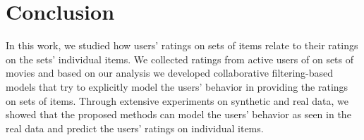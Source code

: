 \section{Conclusion} \label{ch:lfs:conclusion}
In this work, we studied how users' ratings on sets of items relate to their
ratings on the sets' individual items. 
We collected ratings from active users of \ML on sets of movies and based
on our analysis we developed collaborative filtering-based models that try to explicitly model the
users' behavior in providing the ratings on sets of items.
Through extensive experiments on synthetic and real data, we showed that the
proposed methods can model the users' behavior as seen in the real data and
predict the users' ratings on individual items.

\iffalse
For future work, it will be interesting to study how do the performance of the proposed
approaches vary with the different number of items in sets and how do they
perform when instead of having a fixed number of items in sets, the sets contain
a varied number of items in sets.
Also, the performance of the model could be improved by modeling
temporal effects on the ratings and by using side-information like genres or
other movie metadata. Finally, it will be interesting to investigate if similar to the diversity of
ratings in the set there exists other properties at item- or set-level
that can affect a user's ratings on sets of items.
\fi

